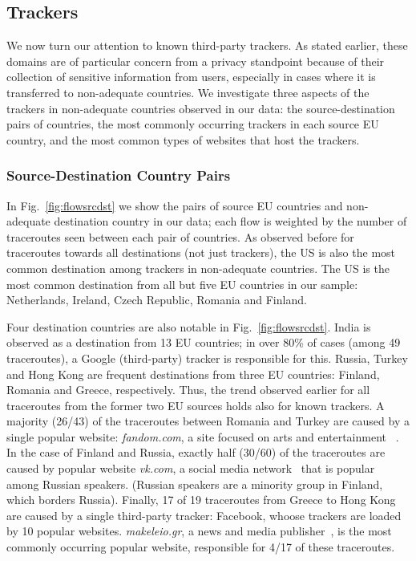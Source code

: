 \begin{table}
\begin{tabular}{ccccccccccccccccccccc}
    \bottomrule

\end{tabular}
\end{table}



\subsection{Trackers}
\label{sec:trackers}
We now turn our attention to known third-party trackers. As
stated earlier, these domains are of particular concern from
a privacy standpoint because of their collection of
sensitive information from users, especially in cases
where it is transferred to non-adequate countries. 
We investigate three aspects of the trackers in non-adequate countries 
observed in our data:
the source-destination pairs of countries, the most commonly occurring trackers in 
each source EU country, and the most common types of websites that host the trackers.

\subsubsection{Source-Destination Country Pairs}
In Fig.~\ref{fig:flowsrcdst} we show the pairs of
source EU countries and non-adequate destination country in our
data; each flow is weighted by the 
number of traceroutes seen between each pair of countries. 
As observed before for traceroutes towards all
destinations (not just trackers), the US is also the most common destination
among trackers in non-adequate countries. The US is the 
most common destination from all but five EU countries in our
sample: Netherlands, Ireland, Czech Republic, Romania and Finland.

Four destination countries are also notable in Fig.~\ref{fig:flowsrcdst}.
India is observed as a destination from 13 EU countries; in over
80\% of cases (among 49 traceroutes), a Google (third-party) tracker is responsible
for this. Russia, Turkey and
Hong Kong are frequent destinations from three EU countries: Finland, Romania
and Greece, respectively. Thus, the trend observed earlier for all traceroutes
from the former two EU sources holds also for known trackers. 
A majority (26/43) of the traceroutes between Romania and Turkey are
caused by a single popular website: \textit{fandom.com},
a site focused on arts and entertainment ~\cite{SimilarWeb}.
In the case of Finland and Russia, exactly half (30/60) of
the traceroutes are caused by popular website \textit{vk.com},
a social media network~\cite{SimilarWeb} that is popular among Russian speakers.
(Russian speakers are a minority group in Finland, which borders Russia).
Finally, 17 of 19 traceroutes
from Greece to Hong Kong are caused by a single third-party tracker: Facebook, 
whoose trackers are loaded by 10 popular websites. \textit{makeleio.gr}, a news and
media publisher~\cite{SimilarWeb}, is the most commonly occurring popular website, responsible for 4/17 of
these traceroutes. 

